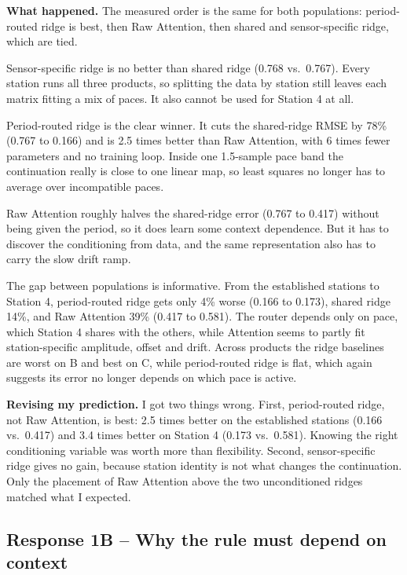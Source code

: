 \documentclass[11pt]{article}
\begin{document}
\textbf{What happened.} The measured order is the same for both populations: period-routed ridge
is best, then Raw Attention, then shared and sensor-specific ridge, which are tied.

Sensor-specific ridge is no better than shared ridge (0.768 vs.\ 0.767). Every station runs all
three products, so splitting the data by station still leaves each matrix fitting a mix of paces.
It also cannot be used for Station 4 at all.

Period-routed ridge is the clear winner. It cuts the shared-ridge RMSE by 78\% (0.767 to 0.166)
and is 2.5 times better than Raw Attention, with 6 times fewer parameters and no training loop.
Inside one 1.5-sample pace band the continuation really is close to one linear map, so least
squares no longer has to average over incompatible paces.

Raw Attention roughly halves the shared-ridge error (0.767 to 0.417) without being given the
period, so it does learn some context dependence. But it has to discover the conditioning from
data, and the same representation also has to carry the slow drift ramp.

The gap between populations is informative. From the established stations to Station 4,
period-routed ridge gets only 4\% worse (0.166 to 0.173), shared ridge 14\%, and Raw Attention 39\%
(0.417 to 0.581). The router depends only on pace, which Station 4 shares with the others, while
Attention seems to partly fit station-specific amplitude, offset and drift. Across products the
ridge baselines are worst on B and best on C, while period-routed ridge is flat, which again
suggests its error no longer depends on which pace is active.

\textbf{Revising my prediction.} I got two things wrong. First, period-routed ridge, not Raw
Attention, is best: 2.5 times better on the established stations (0.166 vs.\ 0.417) and 3.4 times
better on Station 4 (0.173 vs.\ 0.581). Knowing the right conditioning variable was worth more than
flexibility. Second, sensor-specific ridge gives no gain, because station identity is not what
changes the continuation. Only the placement of Raw Attention above the two unconditioned ridges
matched what I expected.

\subsection*{Response 1B -- Why the rule must depend on context}
\end{document}
